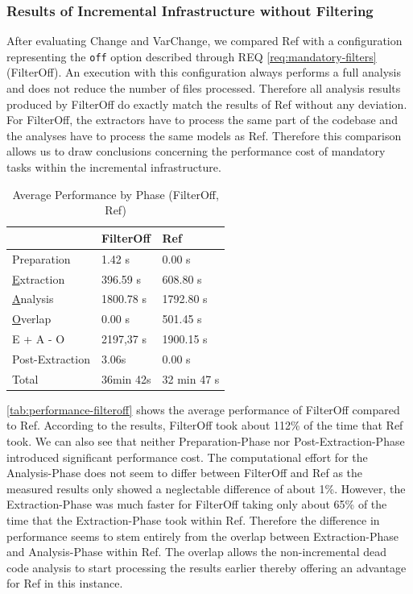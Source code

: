 \documentclass[a4paper]{article}
\begin{document}
 \clearpage
 \newpage
\subsubsection{Results of Incremental Infrastructure without Filtering}\label{evaluation-filteroff}

After evaluating Change and VarChange, we compared Ref with a configuration representing the \texttt{off} option described through REQ \ref{req:mandatory-filters} (FilterOff). An execution with this configuration always performs a full analysis and does not reduce the number of files processed. Therefore all analysis results produced by FilterOff do exactly match the results of Ref without any deviation. For FilterOff, the extractors have to process the same part of the codebase and the analyses have to process the same models as Ref. Therefore this comparison allows us to draw conclusions concerning the performance cost of mandatory tasks within the incremental infrastructure.

\begin {table}[h]
\begin{center}
\caption {Average Performance by Phase (FilterOff, Ref)} \label{tab:performance-filteroff} 
\begin{tabular}{|l | l | l|}
\hline
                               & FilterOff                   & Ref  \\ \hline
	Preparation                & 1.42 s                      & 0.00 s \\
	\underline{E}xtraction     & 396.59 s                    & 608.80 s \\
	\underline{A}nalysis       & 1800.78 s                   & 1792.80 s \\
	\underline{O}verlap        & 0.00 s                      & 501.45 s \\
	E + A - O                  & 2197,37 s                   & 1900.15 s \\
	Post-Extraction            & 3.06s                       & 0.00 s \\ \hline
	Total                      & 36min 42s                   & 32 min 47 s \\ \hline
\end{tabular}
\end{center}
\end{table}

\autoref{tab:performance-filteroff} shows the average performance of FilterOff compared to Ref. According to the results, FilterOff took about 112\% of the time that Ref took. We can also see that neither Preparation-Phase nor Post-Extraction-Phase introduced significant performance cost. The computational effort for the Analysis-Phase does not seem to differ between FilterOff and Ref as the measured results only showed a neglectable difference of about 1\%. However, the Extraction-Phase was much faster for FilterOff taking only about 65\% of the time that the Extraction-Phase took within Ref. Therefore the difference in performance seems to stem entirely from the overlap between Extraction-Phase and Analysis-Phase within Ref. The overlap allows the non-incremental dead code analysis to start processing the results earlier thereby offering an advantage for Ref in this instance. 
\end{document}
